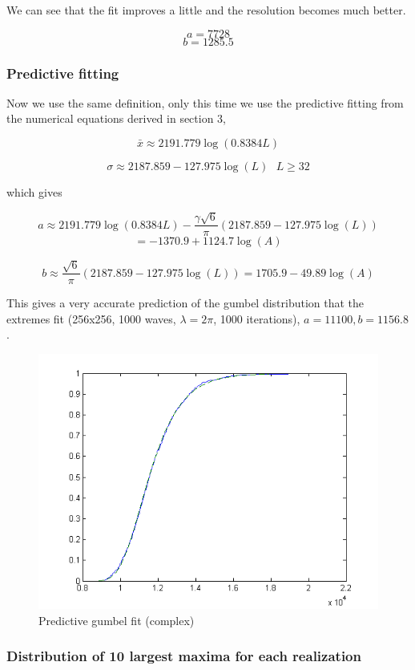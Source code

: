 \documentclass[12pt]{article}
\begin{document}
We can see that the fit improves a little and the resolution becomes much better.

\[a = 7728\]
\[b = 1285.5\]

\subsubsection{Predictive fitting}

Now we use the same definition, only this time we use the predictive fitting from the numerical equations derived in section 3,

\[\bar{x} \approx 2191.779 \log(0.8384 L)\]

\[\sigma \approx 2187.859 - 127.975\log(L) \ \ \ L \geq 32\]

which gives

\[a \approx 2191.779 \log(0.8384 L) - \frac{\gamma \sqrt{6}}{\pi}(2187.859 - 127.975\log(L))\]
\[= -1370.9 + 1124.7 \log(A)\]

\[b \approx \frac{\sqrt{6}}{\pi}(2187.859 - 127.975\log(L)) = 1705.9 - 49.89 \log(A)\]

This gives a very accurate prediction of the gumbel distribution that the extremes fit (256x256, 1000 waves, $\lambda = 2\pi$, 1000 iterations), $a = 11100, b = 1156.8$.

\begin{figure}[hpt]
	\centering
		\includegraphics[width=1.00\textwidth]{predictive_gumb_complex.png}
	\caption{Predictive gumbel fit (complex)}
	\label{fig:predictive_gumb_complex}
\end{figure}


\subsubsection{Distribution of 10 largest maxima for each realization}
\end{document}
